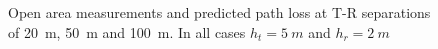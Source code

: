 \documentclass[10pt,journal,twoside]{IEEEtran}
\begin{document}
\begin{figure}
	\centering
	\hfil
	\hfil
	\caption{Open area measurements and predicted path loss at T-R separations of \protect{} \SI{20}{m}, \protect{} \SI{50}{m} and \protect{} \SI{100}{m}. In all cases $h_t = \SI{5}{m}$ and $h_r = \SI{2}{m}$}
	\label{fig:pl_control}
\end{figure}
%
\end{document}
